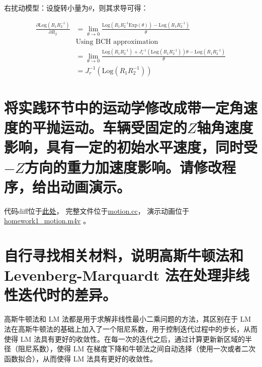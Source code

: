 \documentclass{article}
\begin{document}
右扰动模型：设旋转小量为$\theta$，则其求导可得：

\begin{equation*}
\begin{aligned}
\frac{\partial \mathrm{Log}(R_1R_2^{-1})}{\partial R_2}
    &= \lim\limits_{\theta\to 0}
        \frac
            {\mathrm{Log}(R_1R_2^{-1}\mathrm{Exp}(\theta))-\mathrm{Log}(R_1R_2^{-1})}
            {\theta} \\
    &\text{Using BCH approximation} \\
    &= \lim\limits_{\theta\to 0}
        \frac
            {\mathrm{Log}(R_1R_2^{-1})+J_r^{-1}(\mathrm{Log}(R_1R_2^{-1}))\theta-\mathrm{Log}(R_1R_2^{-1})}
            {\theta} \\
    &= J_r^{-1}(\mathrm{Log}(R_1R_2^{-1}))
\end{aligned}
\end{equation*}

\section{将实践环节中的运动学修改成带一定角速度的平抛运动。车辆受固定的$Z$轴角速度影响，具有一定的初始水平速度，同时受$-Z$方向的重力加速度影响。请修改程序，给出动画演示。}

代码diff位于\href{https://github.com/kunlin596/slam_in_autonomous_driving/commit/94c7c97492d4d68331b6ec1dd58b313b7d00a28a}{此处}，
完整文件位于\href{https://github.com/kunlin596/slam_in_autonomous_driving/blob/homework-1/src/ch2/motion.cc}{motion.cc}，
演示动画位于\href{https://github.com/kunlin596/slam_in_autonomous_driving/blob/homework-1/homework/homework1_motion.m4v}{homework1\_motion.m4v}
。

\section{自行寻找相关材料，说明高斯牛顿法和 Levenberg-Marquardt 法在处理非线性迭代时的差异。}

高斯牛顿法和 LM 法都是用于求解非线性最小二乘问题的方法，其区别在于 LM 法在高斯牛顿法的基础上加入了一个阻尼系数，用于控制迭代过程中的步长，从而使得 LM 法具有更好的收敛性。在每一次的迭代之后，通过计算更新新区域的半径（阻尼系数），使得 LM 在梯度下降和牛顿法之间自动选择（使用一次或者二次函数拟合），从而使得 LM 法具有更好的收敛性。
\end{document}
